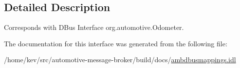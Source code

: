 \subsection{Detailed Description}
Corresponds with D\+Bus Interface org.\+automotive.\+Odometer. 

The documentation for this interface was generated from the following file\+:\begin{DoxyCompactItemize}
\item 
/home/kev/src/automotive-\/message-\/broker/build/docs/\hyperlink{ambdbusmappings_8idl}{ambdbusmappings.\+idl}\end{DoxyCompactItemize}
